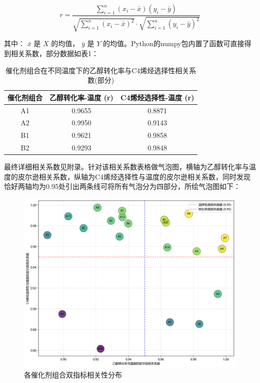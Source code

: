 $$
r = \frac{\sum_{i=1}^{n} (x_i - \bar{x})(y_i - \bar{y})}{\sqrt{\sum_{i=1}^{n} (x_i - \bar{x})^2} \cdot \sqrt{\sum_{i=1}^{n} (y_i - \bar{y})^2}}
$$

其中：
 $ \bar{x} $ 是 $ X $ 的均值，
 $ \bar{y} $ 是 $ Y $ 的均值。Python的numpy包内置了函数可直接得到相关系数，部分数据如表1：
 
\begin{table}[!htbp]
	\caption{催化剂组合在不同温度下的乙醇转化率与C4烯烃选择性相关系数(部分)}
	\centering
	\begin{tabular}{c c c}
		\hline
		\multicolumn{1}{c}{催化剂组合} & \multicolumn{1}{c}{乙醇转化率-温度 (r)} & \multicolumn{1}{c}{C4烯烃选择性-温度 (r)} \\
		\hline
		A1  & 0.9655 & 0.8871 \\
		A2  & 0.9950 & 0.9143 \\
		B1  & 0.9621 & 0.9858 \\
		B2  & 0.9293 & 0.9848 \\
		\hline
	\end{tabular}
	\label{tab:1}
\end{table}

最终详细相关系数见附录。针对该相关系数表格做气泡图，横轴为乙醇转化率与温度的皮尔逊相关系数，纵轴为C4烯烃选择性与温度的皮尔逊相关系数，同时发现恰好两轴均为0.95处引出两条线可将所有气泡分为四部分，所绘气泡图如下：

\begin{figure}[h]%
	\centering%
	\includegraphics [scale=0.6]{图/1-2-2.png}
	\caption{各催化剂组合双指标相关性分布} 
	\label{fig:1}
\end{figure}

